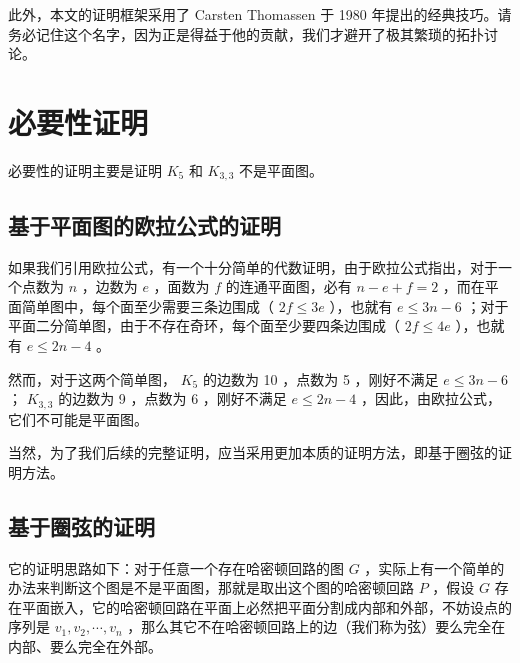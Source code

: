 \documentclass[11pt, a4paper]{ctexart}
\begin{document}
此外，本文的证明框架采用了 Carsten Thomassen 于 1980 年提出的经典技巧。请务必记住这个名字，因为正是得益于他的贡献，我们才避开了极其繁琐的拓扑讨论。

\section{必要性证明}

必要性的证明主要是证明 $K_5$ 和 $K_{3,3}$ 不是平面图。

\subsection{基于平面图的欧拉公式的证明}

如果我们引用欧拉公式，有一个十分简单的代数证明，由于欧拉公式指出，对于一个点数为 $n$ ，边数为 $e$ ，面数为 $f$ 的连通平面图，必有 $n-e+f=2$ ，而在平面简单图中，每个面至少需要三条边围成（ $2f\le 3e$ ），也就有 $e\le 3n-6$ ；对于平面二分简单图，由于不存在奇环，每个面至少要四条边围成（ $2f\le 4e$ ），也就有 $e\le 2n-4$ 。

然而，对于这两个简单图， $K_5$ 的边数为 10 ，点数为 5 ，刚好不满足 $e\le 3n-6$ ； $K_{3,3}$ 的边数为 9 ，点数为 6 ，刚好不满足 $e\le 2n-4$ ，因此，由欧拉公式，它们不可能是平面图。

当然，为了我们后续的完整证明，应当采用更加本质的证明方法，即基于圈弦的证明方法。

\subsection{基于圈弦的证明}

它的证明思路如下：对于任意一个存在哈密顿回路的图 $G$ ，实际上有一个简单的办法来判断这个图是不是平面图，那就是取出这个图的哈密顿回路 $P$ ，假设 $G$ 存在平面嵌入，它的哈密顿回路在平面上必然把平面分割成内部和外部，不妨设点的序列是 $v_1,v_2,\cdots,v_n$ ，那么其它不在哈密顿回路上的边（我们称为弦）要么完全在内部、要么完全在外部。
\end{document}

